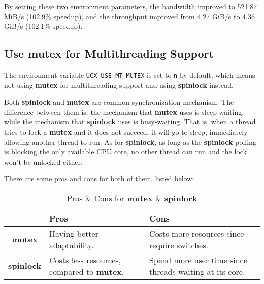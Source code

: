 \documentclass{article}
\begin{document}
By setting these two environment parameters, the bandwidth improved to 521.87 MiB/s (102.9\% speedup), and the throughput improved from 4.27 GiB/s to 4.36 GiB/s (102.1\% speedup).

\subsection{Use mutex for Multithreading Support}

The environment variable \texttt{UCX\_USE\_MT\_MUTEX} is set to \texttt{n} by default, which means not using \textbf{mutex} for multithreading support and using \textbf{spinlock} instead. 

Both \textbf{spinlock} and \textbf{mutex} are common synchronization mechanism.
The difference between them is: the mechanism that \textbf{mutex} uses is sleep-waiting, while the mechanism that \textbf{spinlock} uses is busy-waiting. That is, when a thread tries to lock a \textbf{mutex} and it does not succeed, it will go to sleep, immediately allowing another thread to run. As for \textbf{spinlock}, as long as the \textbf{spinlock} polling is blocking the only available CPU core, no other thread can run and the lock won't be unlocked either.

There are some pros and cons for both of them, listed below:
\begin{table}[htbp]
    \centering
    \caption*{Pros \& Cons for \textbf{mutex} \& \textbf{spinlock}}
    \begin{tabularx}{\linewidth}{c|XX}
        & Pros & Cons \\\hline
        \textbf{mutex} & Having better adaptability. & Costs more resources since require switches. \\
        \textbf{spinlock} & Costs less resources, compared to \textbf{mutex}. & Spend more user time since threads waiting at its core.
    \end{tabularx}
    \label{tab:mutex}
\end{table}
\end{document}
